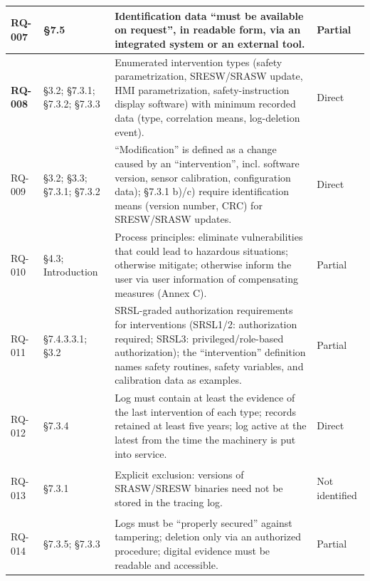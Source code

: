 \begin{longtable}{|>{\bfseries}p{1cm}|p{2.5cm}|p{9cm}|>{\centering\arraybackslash}p{2cm}|}
	RQ-007 &
	\S7.5 &
	Identification data ``must be available on request'', in readable form, via an integrated system or an external tool. &
	Partial \\
	\hline
	
	RQ-008 &
	\S3.2; \S7.3.1; \S7.3.2; \S7.3.3 &
	Enumerated intervention types (safety parametrization, SRESW/SRASW update, HMI parametrization, safety-instruction display software) with minimum recorded data (type, correlation means, log-deletion event). &
	Direct \\
	\hline
	
	RQ-009 &
	\S3.2; \S3.3; \S7.3.1; \S7.3.2 &
	``Modification'' is defined as a change caused by an ``intervention'', incl. software version, sensor calibration, configuration data); \S7.3.1 b)/c) require identification means (version number, CRC) for SRESW/SRASW updates. &
	Direct \\
	\hline
	
	RQ-010 &
	\S4.3; Introduction &
	Process principles: eliminate vulnerabilities that could lead to hazardous situations; otherwise mitigate; otherwise inform the user via user information of compensating measures (Annex C). &
	Partial \\
	\hline
	
	RQ-011 &
	\S7.4.3.3.1; \S3.2 &
	SRSL-graded authorization requirements for interventions (SRSL1/2: authorization required; SRSL3: privileged/role-based authorization); the ``intervention'' definition names safety routines, safety variables, and calibration data as examples. &
	Partial \\
	\hline
	
	RQ-012 &
	\S7.3.4 &
	Log must contain at least the evidence of the last intervention of each type; records retained at least five years; log active at the latest from the time the machinery is put into service. &
	Direct \\
	\hline
	
	RQ-013 &
	\S7.3.1 &
	Explicit exclusion: versions of SRASW/SRESW binaries need not be stored in the tracing log. &
	Not identified \\
	\hline
	
	RQ-014 &
	\S7.3.5; \S7.3.3 &
	Logs must be ``properly secured'' against tampering; deletion only via an authorized procedure; digital evidence must be readable and accessible. &
	Partial \\
	\hline
	
	
\end{longtable}

